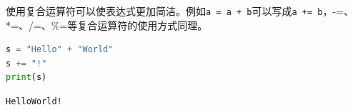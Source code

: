 使用复合运算符可以使表达式更加简洁。例如\lstinline|a = a + b|可以写成\lstinline|a += b|，-=、*=、/=、\%=等复合运算符的使用方式同理。\\


\begin{lstlisting}[language=Python]
s = "Hello" + "World"
s += "!"
print(s)
\end{lstlisting}

\begin{tcolorbox}
	\begin{verbatim}
HelloWorld!
\end{verbatim}
\end{tcolorbox}

\newpage